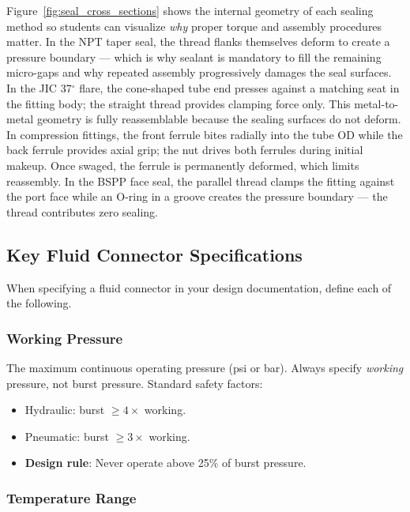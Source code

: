 \documentclass[11pt,letterpaper,twoside,openany]{book}
\providecommand{\ang}[1]{#1\ensuremath{{}^{\circ}}}
\begin{document}
Figure~\ref{fig:seal_cross_sections} shows the internal geometry of each sealing method so students can visualize \emph{why} proper torque and assembly procedures matter. In the NPT taper seal, the thread flanks themselves deform to create a pressure boundary --- which is why sealant is mandatory to fill the remaining micro-gaps and why repeated assembly progressively damages the seal surfaces. In the JIC \ang{37} flare, the cone-shaped tube end presses against a matching seat in the fitting body; the straight thread provides clamping force only. This metal-to-metal geometry is fully reassemblable because the sealing surfaces do not deform. In compression fittings, the front ferrule bites radially into the tube OD while the back ferrule provides axial grip; the nut drives both ferrules during initial makeup. Once swaged, the ferrule is permanently deformed, which limits reassembly. In the BSPP face seal, the parallel thread clamps the fitting against the port face while an O-ring in a groove creates the pressure boundary --- the thread contributes zero sealing.


\subsection{Key Fluid Connector Specifications}
\label{sec:fluidspecs}

When specifying a fluid connector in your design documentation, define each of the following.

\subsubsection{Working Pressure}

The maximum continuous operating pressure (psi or bar). Always specify \emph{working} pressure, not burst pressure. Standard safety factors:
\begin{itemize}[nosep,leftmargin=1.5em]
  \item Hydraulic: burst $\geq 4\times$ working.
  \item Pneumatic: burst $\geq 3\times$ working.
  \item \textbf{Design rule}: Never operate above 25\% of burst pressure.
\end{itemize}

\subsubsection{Temperature Range}
\end{document}
